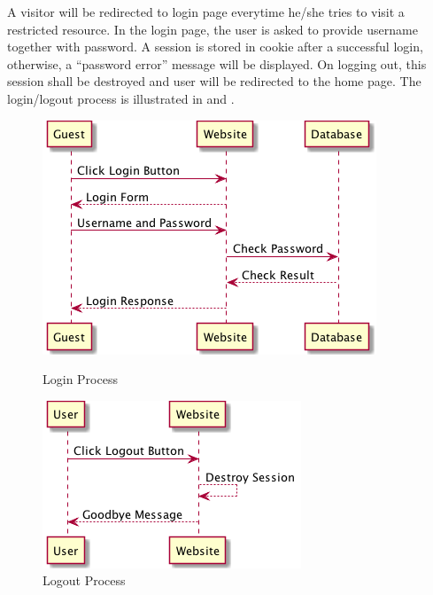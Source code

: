 A visitor will be redirected to login page everytime he/she tries to
visit a restricted resource. In the login page, the user is asked to
provide username together with password. A session is stored in cookie
after a successful login, otherwise, a ``password error'' message will
be displayed. On logging out, this session shall be destroyed and user will be
redirected to the  home page.
The login/logout process is illustrated in  and .
\begin{figure}
\begin{minipage}[b]{0.57\linewidth}
  \centering
  \includegraphics[width=\textwidth]{img/login.png}
  \caption{Login Process \label{fig:login}}
\end{minipage}
\begin{minipage}[b]{0.37\linewidth}
  \centering
  \includegraphics[width=\textwidth]{img/logout.png}
  \caption{Logout Process \label{fig:logout}}
\end{minipage}
\end{figure}



